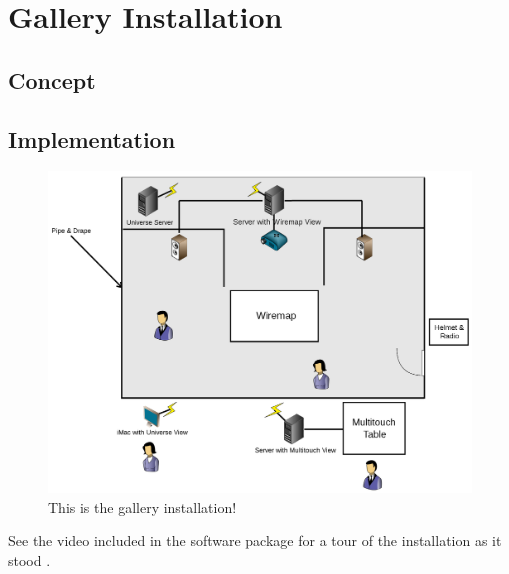 \chapter{Gallery Installation}

\section{Concept}

\section{Implementation}

\begin{figure}[htp]\centering
\includegraphics[width=.99\textwidth]{images/gallery_installation.png}
  \caption{This is the gallery installation!}\label{fig:gallery}
\end{figure}

See the video included in the software package for a tour of the installation as it stood \cite{PACK}.
